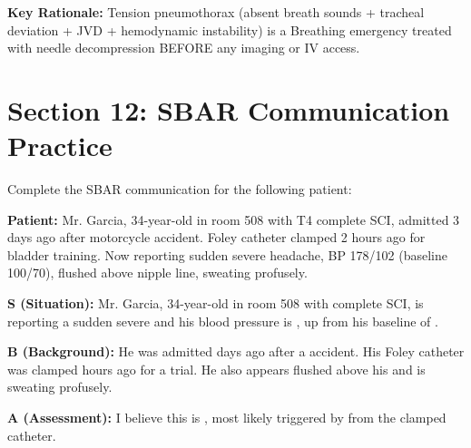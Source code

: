 \documentclass[11pt]{article}
\begin{document}
\textbf{Key Rationale:} Tension pneumothorax (absent breath sounds + tracheal deviation + JVD + hemodynamic instability) is a Breathing emergency treated with needle decompression BEFORE any imaging or IV access.

\newpage
\section*{Section 12: SBAR Communication Practice}

\begin{tcolorbox}[colback=blue!5!white,colframe=blue!75!black,title=SBAR Scenario: Autonomic Dysreflexia]
Complete the SBAR communication for the following patient:

\textbf{Patient:} Mr. Garcia, 34-year-old in room 508 with T4 complete SCI, admitted 3 days ago after motorcycle accident. Foley catheter clamped 2 hours ago for bladder training. Now reporting sudden severe headache, BP 178/102 (baseline 100/70), flushed above nipple line, sweating profusely.
\end{tcolorbox}

\textbf{S (Situation):} Mr. Garcia, 34-year-old in room 508 with \underline{\hspace{2cm}} complete SCI, is reporting a sudden severe \underline{\hspace{2cm}} and his blood pressure is \underline{\hspace{2cm}}, up from his baseline of \underline{\hspace{2cm}}.

\vspace{0.3cm}

\textbf{B (Background):} He was admitted \underline{\hspace{2cm}} days ago after a \underline{\hspace{3cm}} accident. His Foley catheter was clamped \underline{\hspace{2cm}} hours ago for a \underline{\hspace{3cm}} trial. He also appears flushed above his \underline{\hspace{2cm}} and is sweating profusely.

\vspace{0.3cm}

\textbf{A (Assessment):} I believe this is \underline{\hspace{4cm}}, most likely triggered by \underline{\hspace{4cm}} from the clamped catheter.
\end{document}
